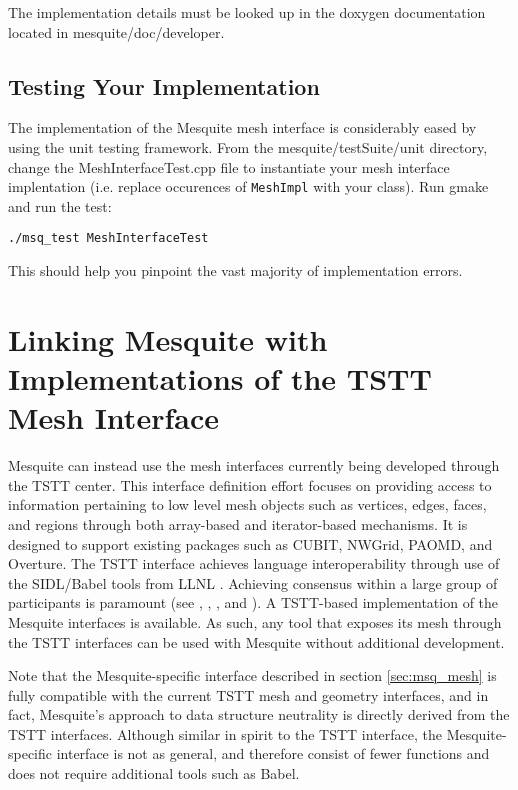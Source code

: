 The implementation details must be looked up in the doxygen documentation located in mesquite/doc/developer.

\subsection{Testing Your Implementation}

The implementation of the Mesquite mesh interface is considerably eased by using the unit testing
framework. From the mesquite/testSuite/unit directory, change the MeshInterfaceTest.cpp file to
instantiate your mesh interface implentation (i.e. replace occurences of \texttt{MeshImpl} with your
class). Run gmake and run the test:
\begin{verbatim} 
./msq_test MeshInterfaceTest
\end{verbatim} 
This should help you pinpoint the vast majority of implementation errors. 


\section{Linking Mesquite with Implementations of the TSTT Mesh Interface} 
\label{sec:TSTT}

Mesquite can instead use the mesh interfaces currently
being developed through the TSTT center.  This interface definition
effort focuses on providing access to information pertaining to low
level mesh objects such as vertices, edges, faces, and regions through
both array-based and iterator-based mechanisms.  It is designed to
support existing packages such as CUBIT, NWGrid, PAOMD, and Overture. 
The TSTT interface achieves language interoperability
through use of the SIDL/Babel tools from LLNL \cite{babel}.
Achieving consensus within a large group of participants is
paramount (see \cite{Cubit-website}, \cite{overture}, \cite{aomd-imr},
and \cite{NWGrid-website}).  
A TSTT-based implementation of the Mesquite
interfaces is available.  As such, any tool that exposes its
mesh through the TSTT interfaces can be used with Mesquite without
additional development.

Note that the Mesquite-specific interface described in section \ref{sec:msq_mesh} is fully compatible
with the current TSTT mesh and geometry interfaces, and in fact,
Mesquite's approach to data structure neutrality is directly derived
from the TSTT interfaces.  Although similar in spirit to the TSTT
interface, the Mesquite-specific interface is not as general, and 
therefore consist of fewer
functions and does not require additional tools such as Babel.

